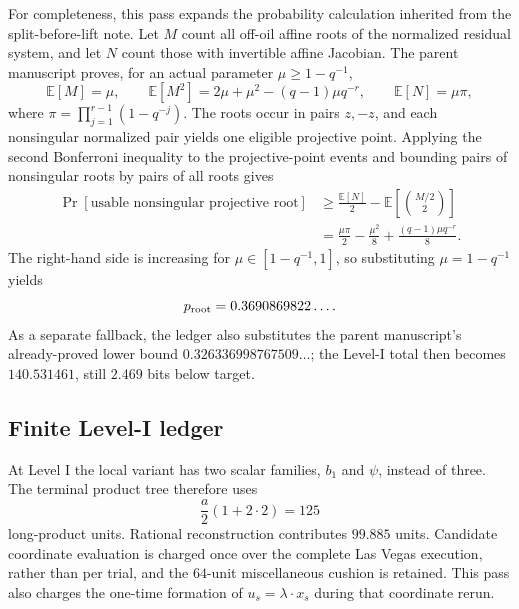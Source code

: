 \documentclass[11pt,a4paper]{article}
\theoremstyle{definition}
\theoremstyle{remark}
\begin{document}
For completeness, this pass expands the probability calculation inherited from the split-before-lift note.  Let $M$ count all off-oil affine roots of the normalized residual system, and let $N$ count those with invertible affine Jacobian.  The parent manuscript proves, for an actual parameter $\mu\ge 1-q^{-1}$,
\[
 \mathbb E[M]=\mu,
 \qquad
 \mathbb E[M^2]=2\mu+\mu^2-(q-1)\mu q^{-r},
 \qquad
 \mathbb E[N]=\mu\pi,
\]
where $\pi=\prod_{j=1}^{r-1}(1-q^{-j})$.  The roots occur in pairs $z,-z$, and each nonsingular normalized pair yields one eligible projective point.  Applying the second Bonferroni inequality to the projective-point events and bounding pairs of nonsingular roots by pairs of all roots gives
\begin{align*}
 \Pr[\text{usable nonsingular projective root}]
 &\ge \frac{\mathbb E[N]}2
      -\mathbb E\!\left[\binom{M/2}{2}\right]\\
 &=\frac{\mu\pi}{2}-\frac{\mu^2}{8}
   +\frac{(q-1)\mu q^{-r}}8.
\end{align*}
The right-hand side is increasing for $\mu\in[1-q^{-1},1]$, so substituting $\mu=1-q^{-1}$ yields
\[
 p_{\rm root}=0.3690869822\ldots.
\]
As a separate fallback, the ledger also substitutes the parent manuscript's already-proved lower bound $0.326336998767509\ldots$; the Level-I total then becomes $140.531461$, still $2.469$ bits below target.

\subsection{Finite Level-I ledger}

At Level I the local variant has two scalar families, $b_1$ and $\psi$, instead of three.  The terminal product tree therefore uses
\[
 \frac a2(1+2\cdot2)=125
\]
long-product units.  Rational reconstruction contributes $99.885$ units.  Candidate coordinate evaluation is charged once over the complete Las Vegas execution, rather than per trial, and the $64$-unit miscellaneous cushion is retained.  This pass also charges the one-time formation of $u_s=\lambda\cdot x_s$ during that coordinate rerun.
\end{document}
